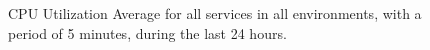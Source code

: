 \begin{figure}[!htbp]
    \centering
    \caption[AWS ECS Advanced Monitoring Example]{CPU Utilization Average for all services in all environments, with a period of 5 minutes, during the last 24 hours.}
    \label{fig:ecs-example-01}
\end{figure} 
    